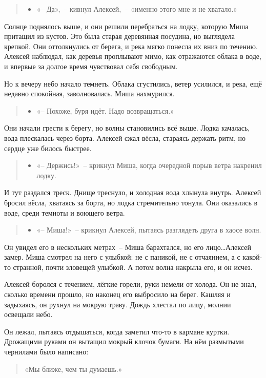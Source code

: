 \documentclass[12pt,a4paper]{book}
\newenvironment{dialogue}{\begin{quote}\itshape\begin{itemize}\item[]}{\end{itemize}\end{quote}}
\begin{document}
\begin{dialogue}
«-- Да»,~-- кивнул Алексей,~-- «именно этого мне и не хватало.»
\end{dialogue}

Солнце поднялось выше, и они решили перебраться на лодку, которую Миша притащил из кустов. Это была старая деревянная посудина, но выглядела крепкой. Они оттолкнулись от берега, и река мягко понесла их вниз по течению. Алексей наблюдал, как деревья проплывают мимо, как отражаются облака в воде, и впервые за долгое время чувствовал себя свободным.

Но к вечеру небо начало темнеть. Облака сгустились, ветер усилился, и река, ещё недавно спокойная, заволновалась. Миша нахмурился.

\begin{dialogue}
«-- Похоже, буря идёт. Надо возвращаться.»
\end{dialogue}

Они начали грести к берегу, но волны становились всё выше. Лодка качалась, вода плескалась через борта. Алексей сжал вёсла, стараясь держать ритм, но сердце уже билось быстрее.

\begin{dialogue}
«-- Держись!»~-- крикнул Миша, когда очередной порыв ветра накренил лодку.
\end{dialogue}

И тут раздался треск. Днище треснуло, и холодная вода хлынула внутрь. Алексей бросил вёсла, хватаясь за борта, но лодка стремительно тонула. Они оказались в воде, среди темноты и воющего ветра.

\begin{dialogue}
«-- Миша!»~-- крикнул Алексей, пытаясь разглядеть друга в хаосе волн.
\end{dialogue}

Он увидел его в нескольких метрах~-- Миша барахтался, но его лицо\ldots Алексей замер. Миша смотрел на него с улыбкой: не с паникой, не с отчаянием, а с какой-то странной, почти зловещей улыбкой. А потом волна накрыла его, и он исчез.

Алексей боролся с течением, лёгкие горели, руки немели от холода. Он не знал, сколько времени прошло, но наконец его выбросило на берег. Кашляя и задыхаясь, он рухнул на мокрую траву. Дождь хлестал по лицу, молнии освещали небо.

Он лежал, пытаясь отдышаться, когда заметил что-то в кармане куртки. Дрожащими руками он вытащил мокрый клочок бумаги. На нём размытыми чернилами было написано:
\begin{quote}
«Мы ближе, чем ты думаешь.»
\end{quote}
\end{document}
